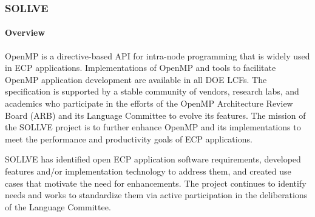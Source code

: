 \subsubsection{SOLLVE}\label{subsubsect:sollve}



\paragraph{Overview}
OpenMP is a directive-based API for intra-node programming that is widely used  in ECP applications. Implementations of OpenMP and  tools to facilitate OpenMP application development are available in all DOE LCFs.  
The specification is supported by a stable community of vendors, research labs, and academics who
participate in the efforts of the  OpenMP Architecture Review Board (ARB) and its Language Committee to evolve its features.
The mission of the SOLLVE project is to further enhance  OpenMP and its implementations to meet the performance and productivity goals of ECP applications. 

SOLLVE has identified open ECP application software requirements, developed features and/or implementation technology to address them, and created use cases that motivate the need for enhancements. 
 The project continues to identify needs and works to standardize them via 
active participation in the deliberations of the Language Committee.  

